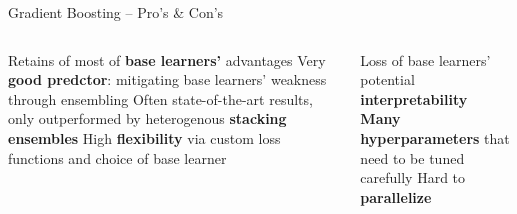 \begin{frame}{Gradient Boosting -- Pro's \& Con's}

\footnotesize

\begin{columns}[onlytextwidth]
  \begin{column}{0.5\textwidth}
    \footnotesize
    \begin{itemize}
      \positem Retains of most of \textbf{base learners'} advantages 
      \positem Very \textbf{good predctor}: mitigating base learners' weakness through ensembling
      \positem Often state-of-the-art results, only outperformed by heterogenous \textbf{stacking ensembles}
      \positem High \textbf{flexibility} via custom loss functions and choice of base learner
    \end{itemize}
  \end{column}
  \begin{column}{0.5\textwidth}
    \footnotesize
    \begin{itemize}
      \negitem Loss of base learners' potential \textbf{interpretability}
      \negitem \textbf{Many hyperparameters} that need to be tuned carefully
      \negitem Hard to \textbf{parallelize}
    \end{itemize}
  \end{column}
\end{columns}

\vfill

\small


\end{frame}


